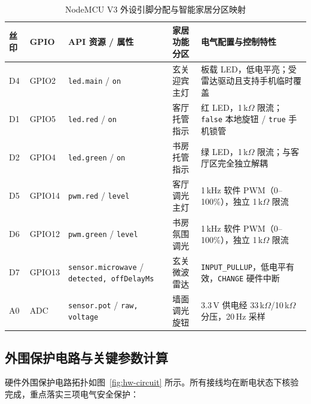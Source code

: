 \documentclass[10.5pt,a4paper]{ctexart}
\newcommand{\code}[1]{{\ttfamily\small\nolinkurl{#1}}}
\begin{document}
\begin{table}[htbp]
\centering
\caption{NodeMCU V3 外设引脚分配与智能家居分区映射}
\label{tab:pinout}
\footnotesize
\begin{tabularx}{\textwidth}{p{0.8cm} p{1.2cm} >{\raggedright\arraybackslash}p{3.1cm} p{2.3cm} Y}
\toprule
\textbf{丝印} & \textbf{GPIO} & \textbf{API 资源 / 属性} & \textbf{家居功能分区} & \textbf{电气配置与控制特性} \\
\midrule
D4 & GPIO2 & \code{led.main} / \code{on} & 玄关迎宾主灯 & 板载 LED，低电平亮；受雷达驱动且支持手机临时覆盖 \\
D1 & GPIO5 & \code{led.red} / \code{on} & 客厅托管指示 & 红 LED，1\,k$\Omega$ 限流；\code{false} 本地旋钮 / \code{true} 手机锁管 \\
D2 & GPIO4 & \code{led.green} / \code{on} & 书房托管指示 & 绿 LED，1\,k$\Omega$ 限流；与客厅区完全独立解耦 \\
D5 & GPIO14 & \code{pwm.red} / \code{level} & 客厅调光主灯 & 1\,kHz 软件 PWM（0--100\%），独立 1\,k$\Omega$ 限流 \\
D6 & GPIO12 & \code{pwm.green} / \code{level} & 书房氛围调光 & 1\,kHz 软件 PWM（0--100\%），独立 1\,k$\Omega$ 限流 \\
D7 & GPIO13 & \code{sensor.microwave} / \code{detected, offDelayMs} & 玄关微波雷达 & \code{INPUT_PULLUP}，低电平有效，\code{CHANGE} 硬件中断 \\
A0 & ADC & \code{sensor.pot} / \code{raw, voltage} & 墙面调光旋钮 & 3.3\,V 供电经 33\,k$\Omega$/10\,k$\Omega$ 分压，20\,Hz 采样 \\
\bottomrule
\end{tabularx}
\end{table}

\subsection{外围保护电路与关键参数计算}
硬件外围保护电路拓扑如图~\ref{fig:hw-circuit} 所示。所有接线均在断电状态下核验完成，重点落实三项电气安全保护：
\end{document}

